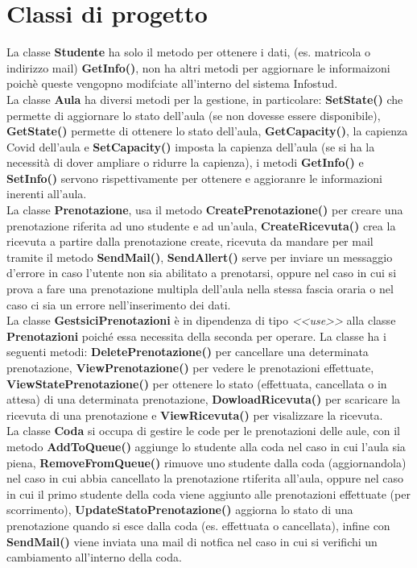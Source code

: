 \section {Classi di progetto}

 
La classe \textbf{Studente} ha solo il metodo per ottenere i dati,  (es. matricola o indirizzo mail) \textbf{GetInfo()}, non ha altri metodi per aggiornare le informaizoni poichè queste vengopno modifciate all’interno del sistema Infostud.\\

\noindent La classe \textbf{Aula} ha diversi metodi per la gestione, in particolare: \textbf{SetState()} che permette di aggiornare lo stato dell’aula (se non dovesse essere disponibile), \textbf{GetState()} permette di ottenere lo stato dell’aula, \textbf{GetCapacity()}, la capienza Covid dell’aula e \textbf{SetCapacity()} imposta la capienza dell’aula (se si ha la necessità di dover ampliare o ridurre la capienza), i metodi \textbf{GetInfo()} e \textbf{SetInfo()} servono rispettivamente per ottenere e aggioranre le informazioni inerenti all’aula.\\
 
 
\noindent La classe \textbf{Prenotazione}, usa il metodo \textbf{CreatePrenotazione()} per creare una prenotazione riferita ad uno studente e ad un’aula, \textbf{CreateRicevuta()} crea la ricevuta a partire dalla prenotazione create, ricevuta da mandare per mail tramite il metodo \textbf{SendMail()}, \textbf{SendAllert()} serve per inviare un messaggio d’errore in caso l’utente non sia abilitato a prenotarsi, oppure nel caso in cui si prova a fare una prenotazione multipla dell’aula nella stessa fascia oraria o nel caso ci sia un errore nell’inserimento dei dati. \\
 

\noindent La classe \textbf{GestsiciPrenotazioni} è in dipendenza di tipo \emph{<<use>>} alla classe \textbf{Prenotazioni} poiché essa necessita della seconda per operare. La classe ha i seguenti metodi: \textbf{DeletePrenotazione()} per cancellare una determinata prenotazione,  \textbf{ViewPrenotazione()} per vedere le prenotazioni effettuate, \textbf{ViewStatePrenotazione()} per ottenere lo stato (effettuata, cancellata o in attesa) di una determinata prenotazione, \textbf{DowloadRicevuta()} per scaricare la ricevuta di una prenotazione e  \textbf{ViewRicevuta()} per visalizzare la ricevuta. \\


\noindent La classe \textbf{Coda} si occupa di gestire le code per le prenotazioni delle aule, con il metodo \textbf{AddToQueue()} aggiunge lo studente alla coda nel caso in cui l’aula sia piena, \textbf{RemoveFromQueue()} rimuove uno studente dalla coda (aggiornandola) nel caso in cui abbia cancellato la prenotazione rtiferita all’aula, oppure nel caso in cui il primo studente della coda  viene aggiunto alle prenotazioni effettuate (per scorrimento), \textbf{UpdateStatoPrenotazione()} aggiorna lo stato di una prenotazione quando si esce dalla coda (es. effettuata o cancellata), infine con \textbf{SendMail()} viene inviata una mail di notfica nel caso in cui si verifichi un cambiamento all’interno della coda.


